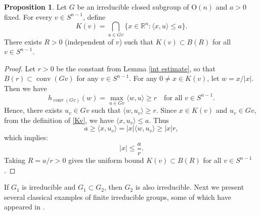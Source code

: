 \documentclass[12pt, reqno]{amsart}
\theoremstyle{definition}
\newtheorem{proposition}[theorem]{Proposition}
\theoremstyle{remark}
\numberwithin{equation}{section}
\newcommand{\conv}{\operatorname{conv}}
\newcommand{\Sn}{S^{n-1}}
\newcommand{\On}{\mathrm{O}(n)}
\begin{document}
	\begin{proposition}\label{unif thm}
		Let $G $ be an irreducible closed subgroup of $\On$ and $a > 0$ fixed. For every  $v \in S^{n-1}$, define
		\begin{equation}\label{Kv}
			K(v) = \bigcap_{u \in Gv} \{ x \in \mathbb{R}^n : \langle x, u \rangle \leq a \}.
		\end{equation}
		There exists $R > 0$ (independent of $v$) such that $K(v) \subset B(R)$ for all  $v\in\Sn$.
	\end{proposition}
	
	\begin{proof}
		Let $r > 0$ be the constant from Lemma \ref{int estimate}, so that $B(r)\subset \conv(Gv)$ for any $v\in \Sn$. For any $0\neq x \in K(v)$,  let $w = x / |x|$. Then we have 
		\[
		h_{\conv(Gv)}(w)=\max_{u \in Gv} \langle w, u \rangle \geq r \quad \text{for all $v\in \Sn$}.
		\]
		Hence, there exists $u_{v}\in Gv$ such that $\langle w, u_{v} \rangle \geq r$.
		Since $x \in K(v)$ and $u_v \in Gv$, from the definition of \eqref{Kv}, we have $\langle x, u_v \rangle \leq a$. Thus
		\[
		a\ge	\langle x, u_v \rangle = |x| \langle w, u_v \rangle \geq |x| r ,
		\]
		which implies:
		\[
		|x| \leq \frac{a}{r}.
		\]
		Taking $R = a / r > 0$ gives the uniform bound $K(v) \subset B(R)$ for all  $v\in \Sn$.
	\end{proof}
	
	
	
	 If $G_1$ is irreducible and $G_1 \subset G_2$, then $G_2$ is also irreducible.
	Next we present several classical examples of finite irreducible groups, some of which have appeared in \cite{BKMZ group}.
	
\end{document}

